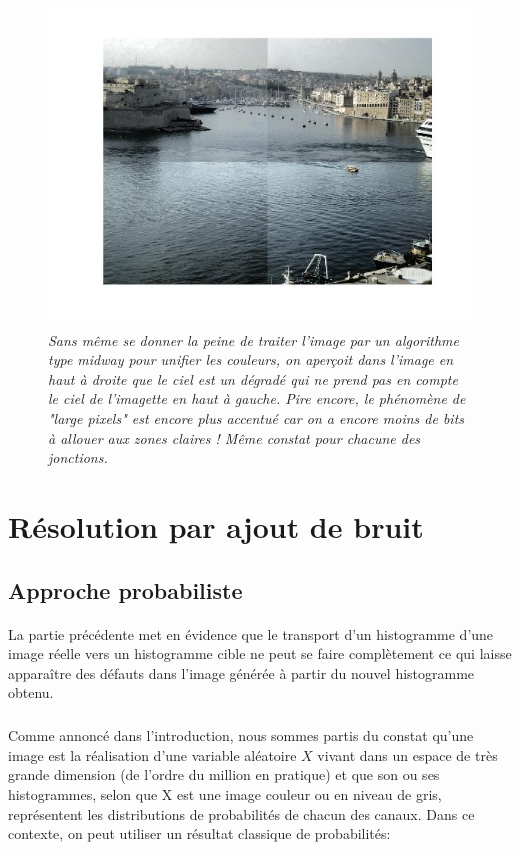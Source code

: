 \documentclass{article}
\begin{document}
\begin{figure}
\includegraphics[scale=0.75]{images/p2_tilling.jpg}
\caption{\textit{Sans même se donner la peine de traiter l'image par un algorithme type midway pour unifier les couleurs, on aperçoit dans l'image en haut à droite que le ciel est un dégradé qui ne prend pas en compte le ciel de l'imagette en haut à gauche. Pire encore, le phénomène de "large pixels" est encore plus accentué car on a encore moins de bits à allouer aux zones claires ! Même constat pour chacune des jonctions.}}
\label{fig:tilling}
\end{figure}

\section*{Résolution par ajout de bruit}
\subsection*{Approche probabiliste}
\paragraph*{}
La partie précédente met en évidence que le transport d'un histogramme d'une image réelle vers un histogramme cible ne peut se faire complètement ce qui laisse apparaître des défauts dans l'image générée à partir du nouvel histogramme obtenu.
\subparagraph*{}
Comme annoncé dans l'introduction, nous sommes partis du constat qu'une image est la réalisation d'une variable aléatoire $X$ vivant dans un espace de très grande dimension (de l'ordre du million en pratique) et que son ou ses histogrammes, selon que X est une image couleur ou en niveau de gris, représentent les distributions de probabilités de chacun des canaux. Dans ce contexte, on peut utiliser un résultat classique de probabilités:
\end{document}
